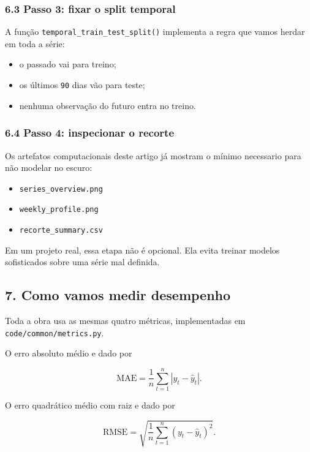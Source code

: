 \documentclass[12pt]{article}
\providecommand{\tightlist}{%
          \setlength{\itemsep}{0pt}\setlength{\parskip}{0pt}}
\begin{document}
\subsubsection{6.3 Passo 3: fixar o split temporal}\label{63-passo-3-fixar-o-split-temporal}

A função \texttt{temporal\_train\_test\_split()} implementa a regra que vamos herdar em toda a série:

\begin{itemize}
\tightlist
\item
  o passado vai para treino;
\item
  os últimos \texttt{90} dias vão para teste;
\item
  nenhuma observação do futuro entra no treino.
\end{itemize}

\subsubsection{6.4 Passo 4: inspecionar o recorte}\label{64-passo-4-inspecionar-o-recorte}

Os artefatos computacionais deste artigo já mostram o mínimo necessario para não modelar no escuro:

\begin{itemize}
\tightlist
\item
  \texttt{series\_overview.png}
\item
  \texttt{weekly\_profile.png}
\item
  \texttt{recorte\_summary.csv}
\end{itemize}

Em um projeto real, essa etapa não é opcional. Ela evita treinar modelos sofisticados sobre uma série mal definida.

\subsection{7. Como vamos medir desempenho}\label{7-como-vamos-medir-desempenho}

Toda a obra usa as mesmas quatro métricas, implementadas em \texttt{code/common/metrics.py}.

O erro absoluto médio e dado por

\[
\mathrm{MAE} = \frac{1}{n} \sum_{t=1}^n |y_t - \hat{y}_t|.
\]

O erro quadrático médio com raiz e dado por

\[
\mathrm{RMSE} = \sqrt{\frac{1}{n} \sum_{t=1}^n (y_t - \hat{y}_t)^2}.
\]
\end{document}
